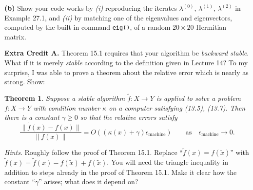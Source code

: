 \documentclass[12pt]{amsart}
\newtheorem*{thm}{Theorem}
\newcommand{\eps}{\epsilon}
\newcommand{\prob}[1]{\bigskip\noindent\textbf{#1.}\quad }
\newcommand{\epart}[1]{\medskip\noindent\textbf{(#1)}\quad }
\begin{document}
\epart{b} Show your code works by \emph{(i)} reproducing the iterates $\lambda^{(0)}$, $\lambda^{(1)}$, $\lambda^{(2)}$ in Example 27.1, and \emph{(ii)} by matching one of the eigenvalues and eigenvectors, computed by the built-in command \verb|eig()|, of a random $20\times 20$ Hermitian matrix.


\prob{Extra Credit A}  Theorem 15.1 requires that your algorithm be \emph{backward stable}.  What if it is merely \emph{stable} according to the definition given in Lecture 14?  To my surprise, I was able to prove a theorem about the relative error which is nearly as strong.  Show:

\newcommand{\emach}{\eps_{\text{machine}}}
\begin{thm}
Suppose a stable algorithm $\tilde f:X\to Y$ is applied to solve a problem $f:X\to Y$ with condition number $\kappa$ on a computer satisfying (13.5), (13.7).  Then there is a constant $\gamma \ge 0$ so that the relative errors satisfy
    $$\frac{\|\tilde f(x) - f(x)\|}{\|f(x)\|} = O\left((\kappa(x) + \gamma) \emach\right) \qquad \text{as} \quad \emach \to 0.$$
\end{thm}

\medskip
\noindent \emph{Hints}.  Roughly follow the proof of Theorem 15.1.  Replace ``$\tilde f(x) = f(\tilde x)$'' with $\tilde f(x) = \tilde f(x) - f(\tilde x) + f(\tilde x)$.  You will need the triangle inequality in addition to steps already in the proof of Theorem 15.1.  Make it clear how the constant ``$\gamma$'' arises; what does it depend on?
\end{document}
